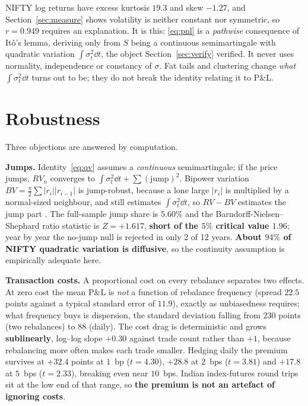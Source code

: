 \documentclass[10pt,a4paper]{article}
\begin{document}
\begin{keybox}
NIFTY log returns have excess kurtosis $19.3$ and skew $-1.27$, and Section~\ref{sec:measure}
shows volatility is neither constant nor symmetric, so $r=0.949$ requires an explanation.
It is this: \eqref{eq:pnl} is a \emph{pathwise} consequence of It\^o's
lemma, deriving only from $S$ being a continuous semimartingale with quadratic variation
$\int\sigma_t^2\dd t$, the object Section~\ref{sec:verify} verified. It never uses
normality, independence or constancy of $\sigma$. Fat tails and clustering change \emph{what}
$\int\sigma_t^2\dd t$ turns out to be; they do not break the identity relating it to P\&L.
\end{keybox}

\section{Robustness}
\label{sec:robust}

Three objections are answered by computation.

\textbf{Jumps.} Identity~\eqref{eq:qv} assumes a \emph{continuous} semimartingale; if the price
jumps, $RV_n$ converges to $\int\sigma_t^2\dd t+\sum(\text{jump})^2$. Bipower variation
$BV=\tfrac{\pi}{2}\sum|r_i||r_{i-1}|$ is jump-robust, because a lone large $|r_i|$ is multiplied by a
normal-sized neighbour, and still estimates $\int\sigma_t^2\dd t$, so $RV-BV$ estimates the
jump part \cite{bns2004}. The full-sample jump share is $\mathbf{5.60\%}$ and the
Barndorff-Nielsen--Shephard ratio statistic is $Z=+1.617$, \textbf{short of the $5\%$ critical
value $1.96$}; year by year the no-jump null is rejected in only 2 of 12 years.
\textbf{About $94\%$ of NIFTY quadratic variation is diffusive}, so the continuity assumption
is empirically adequate here.

\textbf{Transaction costs.} A proportional cost on every rebalance separates two effects. At
zero cost the mean P\&L is \emph{not} a function of rebalance frequency (spread $22.5$
points against a typical standard error of $11.9$), exactly as unbiasedness requires; what
frequency buys is dispersion, the standard deviation falling from $230$ points (two
rebalances) to $88$ (daily). The cost drag is deterministic and grows \textbf{sublinearly},
log--log slope $+0.30$ against trade count rather than $+1$, because rebalancing more often
makes each trade smaller. Hedging daily the premium survives at $+32.4$ points at $1$~bp
($t=4.30$), $+28.8$ at $2$~bps ($t=3.81$) and $+17.8$ at $5$~bps ($t=2.33$), breaking even
near $10$~bps. Indian index-futures round trips sit at the low end of that range, so
\textbf{the premium is not an artefact of ignoring costs}.
\end{document}
